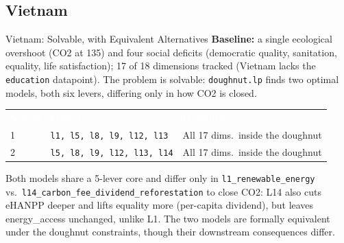 \documentclass[11pt,aspectratio=169]{beamer}
\newcommand{\tblhead}[1]{\textcolor{white}{\textbf{#1}}}
\begin{document}
\subsection{Vietnam}
\begin{frame}{Vietnam: Solvable, with Equivalent Alternatives}
  \footnotesize
  \textbf{Baseline:} a single ecological overshoot (CO2 at 135) and four social deficits (democratic quality, sanitation, equality, life satisfaction); 17 of 18 dimensions tracked (Vietnam lacks the \texttt{education} datapoint). The problem is \alert{solvable}: \texttt{doughnut.lp} finds two optimal models, both six levers, differing only in how CO2 is closed.
  \renewcommand{\arraystretch}{1.15}
  \begin{tabular}{@{}p{1.7cm}p{7cm}p{3.9cm}@{}}
    \rowcolor{doughnutblue} \tblhead{Model} & \tblhead{Levers} & \tblhead{Outcome} \\
    1 & \texttt{l1, l5, l8, l9, l12, l13} & All 17 dims.\ inside the doughnut \\
    2 & \texttt{l5, l8, l9, l12, l13, l14} & All 17 dims.\ inside the doughnut \\
  \end{tabular}

  Both models share a 5-lever core and differ only in \texttt{l1\_renewable\_energy} vs.\ \texttt{l14\_carbon\_fee\_dividend\_reforestation} to close CO2: L14 also cuts eHANPP deeper and lifts equality more (per-capita dividend), but leaves energy\_access unchanged, unlike L1. The two models are formally equivalent under the doughnut constraints, though their downstream consequences differ.
\end{frame}
\end{document}
